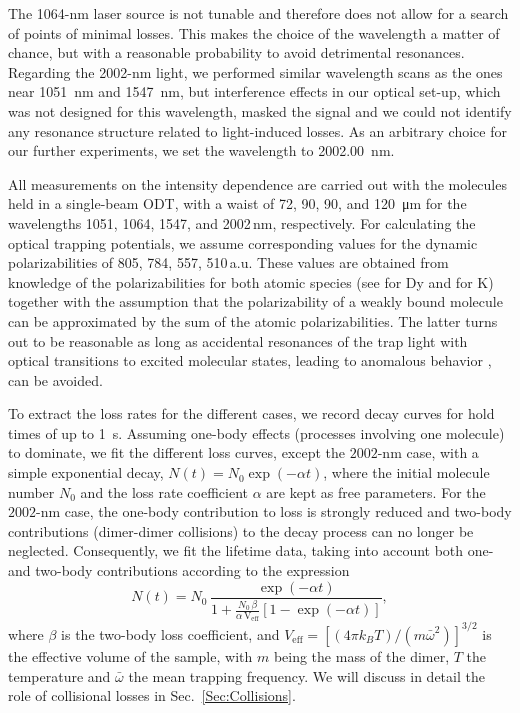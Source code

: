 The 1064-nm laser source is not tunable and therefore does not allow for a search of points of minimal losses. This makes the choice of the wavelength a matter of chance, but with a reasonable probability to avoid detrimental resonances. Regarding the 2002-nm light, we performed similar wavelength scans as the ones near \SI{1051}{nm} and \SI{1547}{nm}, but interference effects in our optical set-up, which was not designed for this wavelength, masked the signal and we could not identify any resonance structure related to light-induced losses. As an arbitrary choice for our further experiments, we set the wavelength to \SI{2002.00}{nm}. 

All measurements on the intensity dependence are carried out with the molecules held in a single-beam ODT, with a waist of 72, 90, 90, and \SI{120}{\micro m} for the wavelengths 1051, 1064, 1547, and 2002\,nm, respectively.
{For calculating the optical trapping potentials, we assume corresponding values for the dynamic polarizabilities of 805, 784, 557, 510\,a.u. These values are obtained from knowledge of the polarizabilities for both atomic species (see \cite{Dzuba2011dpa, Li2017oto, Ravensbergen2018poa} for Dy and \cite{Safronova2013mwf, Kiruga2025pfh} for K) together with the assumption that the polarizability of a weakly bound molecule can be approximated by the sum of the atomic polarizabilities. The latter turns out to be reasonable as long as accidental resonances of the trap light with optical transitions to excited molecular states, leading to anomalous behavior \cite{Melbourne}, can be avoided.
}

To extract the loss rates for the different cases, we record decay curves for hold times of up to \SI{1}{s}. Assuming one-body effects (processes involving one molecule) to dominate, we fit the different loss curves, except the $2002$-nm case, with a simple exponential decay, $N(t)=N_0\exp{(-\alpha t)}$, where the initial molecule number $N_0$ and the loss rate coefficient $\alpha$ are kept as free parameters. For the $2002$-nm case, the one-body contribution to loss is strongly reduced and two-body contributions (dimer-dimer collisions) to the decay process can no longer be neglected. Consequently, we fit the lifetime data, taking into account both one- and two-body contributions according to the expression \cite{Jag2016lof}
\begin{equation}\label{Eq:12bodyfit}
	N(t)=N_0\,\frac{\exp{(-\alpha t)}}{1+\frac{N_0\,\beta}{\alpha\, \mathrm{{V}_{eff}}}[1-\exp{(-\alpha t)}]},
\end{equation}
where $\beta$ is the two-body loss coefficient, and ${V_{\mathrm{eff}}}=[(4\pi k_BT)/(m\bar{\omega}^2)]^{3/2}$ is the effective volume of the sample, with $m$ being the mass of the dimer, $T$ the temperature and $\bar{\omega}$ the mean trapping frequency. We will discuss in detail the role of collisional losses in Sec.~\ref{Sec:Collisions}. 

